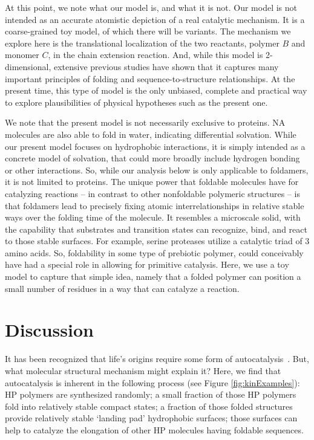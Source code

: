 \documentclass[journal=jacsat,manuscript=article,layout=twocolumn]{achemso}
\begin{document}
 At this point, we note what our model is, and what it is not.  Our model is not intended as an 
 accurate atomistic depiction of a real catalytic mechanism.  It is a coarse-grained toy model, of 
which there will be variants.  The mechanism we explore here is the translational localization of 
the two reactants, polymer $B$ and monomer $C$, in the chain extension reaction.  And, while this 
model is 2-dimensional, extensive previous studies have shown that it captures many important 
principles of folding and sequence-to-structure relationships.  At the present time, this type of 
model is the only unbiased, complete and practical way to explore plausibilities of physical 
hypotheses such as the present one.

We note that the present model is not necessarily exclusive to proteins.  NA molecules are also able 
to fold in water, indicating differential solvation.  While our present model focuses on hydrophobic 
interactions, it is simply intended as a concrete model of solvation, that could more broadly 
include hydrogen bonding or other interactions.  So, while our 
analysis below is only applicable to foldamers, it is not limited to proteins.  The unique power 
that foldable molecules have for catalyzing reactions -- in contrast to other nonfoldable polymeric 
structures -- is that foldamers lead to precisely fixing atomic interrelationships in relative 
stable ways over the folding time of the molecule.  It resembles a 
microscale solid, with the capability that substrates and transition states can recognize, bind, and 
react to those stable surfaces. For example, serine proteases utilize a catalytic triad of 3 amino 
acids.  So, foldability in some type of prebiotic polymer, could conceivably have had a special role 
in allowing for primitive catalysis.  Here, we use a toy model to capture that simple idea, namely 
that a folded polymer can position a small number of residues in a way that can catalyze a reaction.



\section{Discussion}
\label{sec:evolution}
 It has been recognized that life's origins require some form of 
autocatalysis~\cite{Kauffman1986,Dyson1985,Eigen1978}.  But, what molecular structural mechanism 
might explain it?  Here, we find that autocatalysis is inherent in the following process (see 
Figure \ref{fig:kinExamples}):  HP polymers 
are synthesized randomly; a small fraction of those HP polymers fold into relatively stable 
compact 
states; a fraction of those folded structures provide relatively stable `landing pad' hydrophobic 
surfaces; those surfaces can help to catalyze the elongation of other HP molecules having foldable 
sequences.
\end{document}
